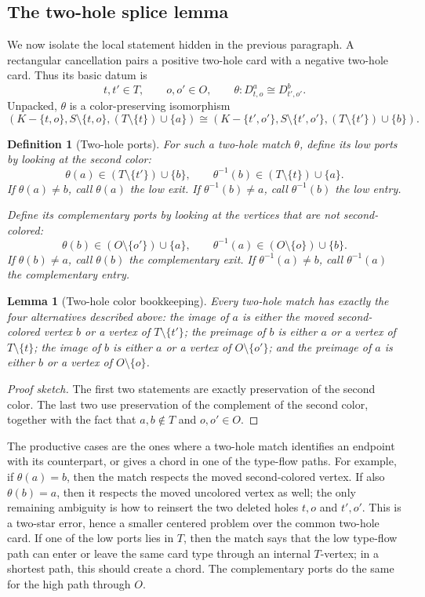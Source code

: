 \documentclass[11pt]{article}
\newtheorem{lemma}{Lemma}
\newtheorem{definition}{Definition}
\begin{document}
\subsection{The two-hole splice lemma}

We now isolate the local statement hidden in the previous paragraph.  A
rectangular cancellation pairs a positive two-hole card with a negative
two-hole card.  Thus its basic datum is
\[
  t,t'\in T,\qquad o,o'\in O,\qquad
  \theta:D_{t,o}^a\cong D_{t',o'}^b.
\]
Unpacked, \(\theta\) is a color-preserving isomorphism
\[
  (K-\{t,o\},S\setminus\{t,o\},(T\setminus\{t\})\cup\{a\})
  \cong
  (K-\{t',o'\},S\setminus\{t',o'\},(T\setminus\{t'\})\cup\{b\}).
\]

\begin{definition}[Two-hole ports]
For such a two-hole match \(\theta\), define its low ports by looking at the
second color:
\[
  \theta(a)\in (T\setminus\{t'\})\cup\{b\},
  \qquad
  \theta^{-1}(b)\in (T\setminus\{t\})\cup\{a\}.
\]
If \(\theta(a)\neq b\), call \(\theta(a)\) the low exit.  If
\(\theta^{-1}(b)\neq a\), call \(\theta^{-1}(b)\) the low entry.

Define its complementary ports by looking at the vertices that are not
second-colored:
\[
  \theta(b)\in (O\setminus\{o'\})\cup\{a\},
  \qquad
  \theta^{-1}(a)\in (O\setminus\{o\})\cup\{b\}.
\]
If \(\theta(b)\neq a\), call \(\theta(b)\) the complementary exit.  If
\(\theta^{-1}(a)\neq b\), call \(\theta^{-1}(a)\) the complementary entry.
\end{definition}

\begin{lemma}[Two-hole color bookkeeping]
Every two-hole match has exactly the four alternatives described above:
the image of \(a\) is either the moved second-colored vertex \(b\) or a
vertex of \(T\setminus\{t'\}\); the preimage of \(b\) is either \(a\) or a
vertex of \(T\setminus\{t\}\); the image of \(b\) is either \(a\) or a
vertex of \(O\setminus\{o'\}\); and the preimage of \(a\) is either \(b\) or
a vertex of \(O\setminus\{o\}\).
\end{lemma}

\begin{proof}[Proof sketch]
The first two statements are exactly preservation of the second color.  The
last two use preservation of the complement of the second color, together
with the fact that \(a,b\notin T\) and \(o,o'\in O\).
\end{proof}

The productive cases are the ones where a two-hole match identifies an
endpoint with its counterpart, or gives a chord in one of the type-flow
paths.  For example, if \(\theta(a)=b\), then the match respects the moved
second-colored vertex.  If also \(\theta(b)=a\), then it respects the moved
uncolored vertex as well; the only remaining ambiguity is how to reinsert
the two deleted holes \(t,o\) and \(t',o'\).  This is a two-star error, hence
a smaller centered problem over the common two-hole card.  If one of the
low ports lies in \(T\), then the match says that the low type-flow path can
enter or leave the same card type through an internal \(T\)-vertex; in a
shortest path, this should create a chord.  The complementary ports do the
same for the high path through \(O\).
\end{document}
